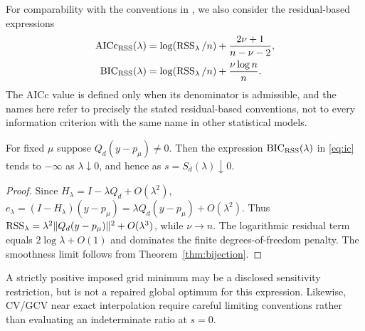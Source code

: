 For comparability with the conventions in \citet{cortes2017}, we also consider the residual-based expressions
\begin{equation}\label{eq:ic}
\begin{aligned}
\mathrm{AICc}_{\operatorname{RSS}}(\lambda)
 &=\log(\operatorname{RSS}_\lambda/n)+\frac{2\nu+1}{n-\nu-2},\\
\mathrm{BIC}_{\operatorname{RSS}}(\lambda)
 &=\log(\operatorname{RSS}_\lambda/n)+\frac{\nu\log n}{n}.
\end{aligned}
\end{equation}
The AICc value is defined only when its denominator is admissible, and the names here refer to precisely the stated residual-based conventions, not to every information criterion with the same name in other statistical models.

\begin{proposition}
\label{prop:bic}
For fixed $\mu$ suppose $Q_d(y-p_\mu)\ne0$. Then the expression $\mathrm{BIC}_{\operatorname{RSS}}(\lambda)$ in \eqref{eq:ic} tends to $-\infty$ as $\lambda\downarrow0$, and hence as $s=S_d(\lambda)\downarrow0$.
\end{proposition}
\begin{proof}
Since $H_\lambda=I-\lambda Q_d+O(\lambda^2)$,
$e_\lambda=(I-H_\lambda)(y-p_\mu)=
\lambda Q_d(y-p_\mu)+O(\lambda^2)$.
Thus $\operatorname{RSS}_\lambda=\lambda^2\|Q_d(y-p_\mu)\|^2+O(\lambda^3)$, while $\nu\to n$. The logarithmic residual term equals $2\log\lambda+O(1)$ and dominates the finite degrees-of-freedom penalty. The smoothness limit follows from Theorem~\ref{thm:bijection}.
\end{proof}
A strictly positive imposed grid minimum may be a disclosed sensitivity restriction, but is not a repaired global optimum for this expression. Likewise, CV/GCV near exact interpolation require careful limiting conventions rather than evaluating an indeterminate ratio at $s=0$.


